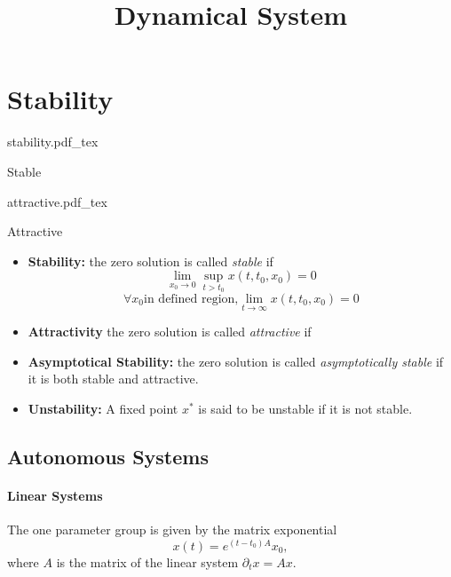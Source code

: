 \documentclass{tufte-handout}
\title{Dynamical System}
\newcommand{\incfig}[1]{%
    \def\svgwidth{\columnwidth}
    {#1.pdf_tex}
}
\begin{document}
\maketitle
\tableofcontents
\section{Stability}
\begin{marginfigure}
    \centering
        \incfig{stability}
	\caption{Stable}
\end{marginfigure}

\begin{marginfigure}
    \centering
		\incfig{attractive}
	\caption{Attractive}
\end{marginfigure}
\begin{definition} 

\begin{itemize}
	\item \textbf{Stability:} the zero solution is called \emph{stable} if 
\[ \lim_{x_0\to 0}\sup_{t > t_0}x(t,t_0,x_0)=0 \]
		\[ \forall x_0 \text{in defined region,} \lim_{t\to\infty}x(t,t_0,x_0)=0 \]
        \item \textbf{Attractivity} the zero solution is called \emph{attractive} if
	\item \textbf{Asymptotical Stability:} the zero solution is called \emph{asymptotically stable} if it is both stable and attractive.
	\item \textbf{Unstability:} A fixed point $x^*$ is said to be unstable if it is not stable.
\end{itemize}
\end{definition}
\subsection{Autonomous Systems}
\paragraph{Linear Systems}

The one parameter group is given by the matrix exponential \[ x(t) = e^{(t-t_0)A}x_0, \]
where $A$ is the matrix of the linear system $\partial_t x = Ax$.
\end{document}
